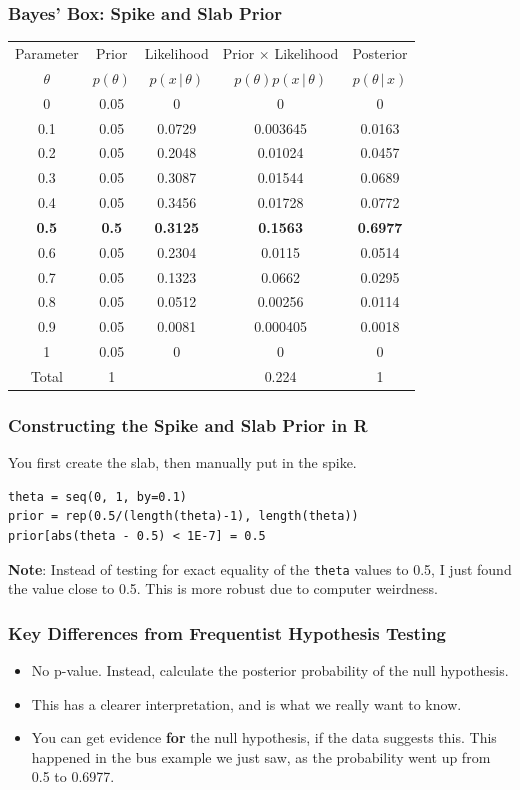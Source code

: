 \documentclass{beamer}
\newcommand{\given}{\,|\,}
\begin{document}
\begin{frame}
\frametitle{Bayes' Box: Spike and Slab Prior}

\centering
{\footnotesize
\begin{tabular}{|c|c|c|c|c|}
\hline
Parameter & Prior & Likelihood & Prior $\times$ Likelihood & Posterior \\
$\theta$  & $p(\theta)$ & $p(x \given \theta)$ & $p(\theta)p(x\given \theta)$ & $p(\theta\given x)$ \\
\hline
0 & 0.05 & 0 & 0 & 0\\
0.1 & 0.05 & 0.0729  & 0.003645 & 0.0163\\
0.2 & 0.05 & 0.2048 & 0.01024  & 0.0457 \\
0.3 & 0.05 & 0.3087 & 0.01544 & 0.0689 \\
0.4 & 0.05 & 0.3456 & 0.01728 & 0.0772 \\
{\bf 0.5} & {\bf 0.5} & {\bf 0.3125} & {\bf 0.1563} & {\bf 0.6977} \\
0.6 & 0.05 & 0.2304 & 0.0115 & 0.0514 \\
0.7 & 0.05 & 0.1323 & 0.0662 & 0.0295 \\
0.8 & 0.05 & 0.0512 & 0.00256 & 0.0114 \\
0.9 & 0.05 & 0.0081 & 0.000405 & 0.0018 \\
1 & 0.05 & 0 & 0 & 0 \\
\hline
Total & 1 & & 0.224 & 1 \\
\hline
\end{tabular}
}

\end{frame}

\begin{frame}[fragile]
\frametitle{Constructing the Spike and Slab Prior in R}
You first create the slab, then manually put in the spike.

\begin{verbatim}
theta = seq(0, 1, by=0.1)
prior = rep(0.5/(length(theta)-1), length(theta))
prior[abs(theta - 0.5) < 1E-7] = 0.5
\end{verbatim}
\pause

{\bf Note}: Instead of testing for exact equality of the
\texttt{theta} values to 0.5, I just found the
value close to 0.5. This is more robust due to computer weirdness.
\end{frame}

\begin{frame}[fragile]
\frametitle{Key Differences from Frequentist Hypothesis Testing}

\begin{itemize}
\item No p-value. Instead, calculate the posterior probability of the null
hypothesis.\pause
\item This has a clearer interpretation, and is what we really want to know.\pause
\item You can get evidence {\bf for} the null hypothesis, if the data
suggests this. This happened in the bus example we just saw, as the
probability went up from 0.5 to 0.6977.
\end{itemize}

\end{frame}
\end{document}
